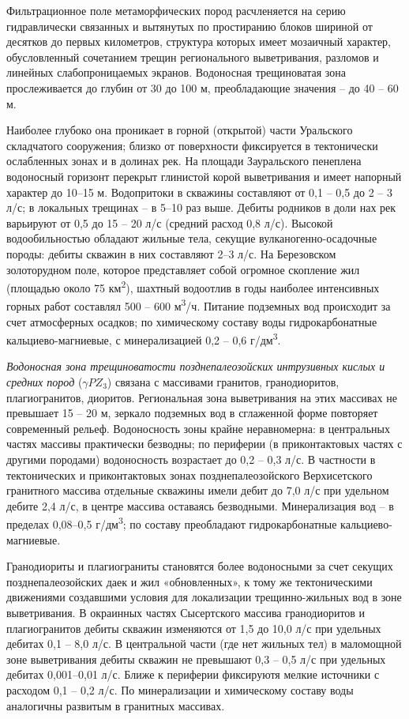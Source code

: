 \documentclass[a4paper,12pt]{article} %
\begin{document}
Фильтрационное поле метаморфических пород расчленяется на серию гидравлически связанных и вытянутых по простиранию блоков шириной от десятков до первых километров, структура которых имеет мозаичный характер, обусловленный сочетанием трещин регионального выветривания, разломов и линейных слабопроницаемых экранов. Водоносная трещиноватая зона прослеживается до глубин от 30 до 100 м, преобладающие значения – до 40 – 60 м.

Наиболее глубоко она проникает в горной (открытой) части Уральского складчатого сооружения; близко от поверхности фиксируется в тектонически ослабленных зонах и в долинах рек. На площади Зауральского пенеплена водоносный горизонт перекрыт глинистой корой выветривания и имеет напорный характер до 10–15 м. Водопритоки в скважины составляют от 0,1 – 0,5 до 2 – 3 л/с; в локальных трещинах – в 5–10 раз выше. Дебиты родников в доли нах рек варьируют от 0,5 до 15 – 20 л/с (средний расход 0,8 л/с).
Высокой водообильностью обладают жильные тела, секущие вулканогенно-осадочные породы: дебиты скважин в них составляют 2–3 л/с. На Березовском золоторудном поле, которое представляет собой огромное скопление жил (площадью около 75 км\textsuperscript{2}), шахтный водоотлив в годы наиболее интенсивных горных работ составлял 500 – 600 м\textsuperscript{3}/ч. Питание подземных вод происходит за счет атмосферных осадков; по химическому составу воды гидрокарбонатные кальциево-магниевые, с минерализацией 0,2 – 0,6 г/дм\textsuperscript{3}.

\textit{Водоносная зона трещиноватости позднепалеозойских интрузивных кислых и средних пород} ($\gamma PZ_3$) связана с массивами гранитов, гранодиоритов, плагиогранитов, диоритов. Региональная зона выветривания на этих массивах не превышает 15 – 20 м, зеркало подземных вод в сглаженной форме повторяет современный рельеф. Водоносность зоны крайне неравномерна: в центральных частях массивы практически безводны; по периферии (в приконтактовых частях с другими породами) водоносность возрастает до 0,2 – 0,3 л/с. В частности в тектонических и приконтактовых зонах позднепалеозойского Верхисетского гранитного массива отдельные скважины имели дебит до 7,0 л/с при удельном дебите 2,4 л/с, в центре массива оставаясь безводными. Минерализация вод – в пределах 0,08–0,5 г/дм\textsuperscript{3}; по составу преобладают гидрокарбонатные  кальциево-магниевые.

Гранодиориты и плагиограниты становятся более водоносными за счет секущих позднепалеозойских даек и жил «обновленных», к тому же тектоническими движениями создавшими условия для локализации трещинно-жильных вод в зоне выветривания. В окраинных частях Сысертского массива гранодиоритов и плагиогранитов дебиты скважин изменяются от 1,5 до 10,0 л/с при удельных дебитах 0,1 – 8,0 л/с. В центральной части (где нет жильных тел) в маломощной зоне выветривания дебиты скважин не превышают 0,3 – 0,5 л/с при удельных дебитах 0,001–0,01 л/с. Ближе к периферии фиксируютя мелкие источники с расходом 0,1 – 0,2 л/с. По минерализации и химическому составу воды аналогичны развитым в гранитных массивах. 
\end{document}
